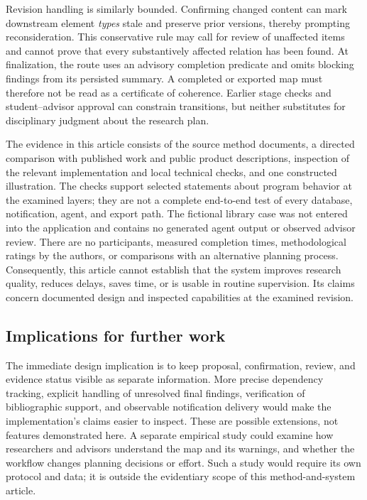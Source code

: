 Revision handling is similarly bounded. Confirming changed content can mark downstream element \emph{types} stale and preserve prior versions, thereby prompting reconsideration. This conservative rule may call for review of unaffected items and cannot prove that every substantively affected relation has been found. At finalization, the route uses an advisory completion predicate and omits blocking findings from its persisted summary. A completed or exported map must therefore not be read as a certificate of coherence. Earlier stage checks and student--advisor approval can constrain transitions, but neither substitutes for disciplinary judgment about the research plan.

The evidence in this article consists of the source method documents, a directed comparison with published work and public product descriptions, inspection of the relevant implementation and local technical checks, and one constructed illustration. The checks support selected statements about program behavior at the examined layers; they are not a complete end-to-end test of every database, notification, agent, and export path. The fictional library case was not entered into the application and contains no generated agent output or observed advisor review. There are no participants, measured completion times, methodological ratings by the authors, or comparisons with an alternative planning process. Consequently, this article cannot establish that the system improves research quality, reduces delays, saves time, or is usable in routine supervision. Its claims concern documented design and inspected capabilities at the examined revision.

\subsection{Implications for further work}

The immediate design implication is to keep proposal, confirmation, review, and evidence status visible as separate information. More precise dependency tracking, explicit handling of unresolved final findings, verification of bibliographic support, and observable notification delivery would make the implementation's claims easier to inspect. These are possible extensions, not features demonstrated here. A separate empirical study could examine how researchers and advisors understand the map and its warnings, and whether the workflow changes planning decisions or effort. Such a study would require its own protocol and data; it is outside the evidentiary scope of this method-and-system article.
